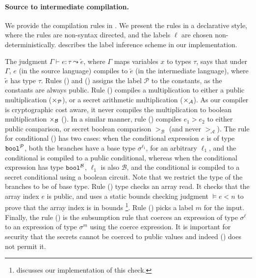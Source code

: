\paragraph{Source to intermediate compilation.} We provide the compilation
rules in . We present the rules in a
declarative style, where the rules are non-syntax
directed, and the labels $\ell$ are chosen
non-deterministically.  describes the label  inference
scheme in our implementation.

The judgment $\Gamma \vdash e : \tau \leadsto \widetilde{e}$, where
$\Gamma$ maps variables $x$ to types $\tau$, says that
under $\Gamma$, $e$ (in the source language) compiles to $\widetilde{e}$
(in the intermediate language), where $\widetilde{e}$ has type $\tau$.
Rules ({}) and ({}) assigns the label
$\mathcal{P}$ to the constants, as the constants are always
public. Rule ({})
compiles a multiplication to either a public multiplication  ($\times_{\mathcal{P}}$), or a
secret arithmetic multiplication ($\times_{\mathcal{A}}$). As
our compiler is cryptographic cost aware, it never compiles the
multiplication to boolean multiplication $\times_{\mathcal{B}}$ (). In a similar manner,
rule ({}) compiles $e_{1} > e_{2}$ to either public comparison,
or secret boolean comparison $>_\mathcal{B}$ (and never
$>_{\mathcal{A}}$).
%
The rule for conditional
({}) has two cases: when the conditional expression $e$ is of
type ${\mathtt{bool}}^{\mathcal{P}}$, both the branches have a base type
$\sigma^{\ell_{1}}$, for an arbitrary $\ell_{1}$, and the conditional is
compiled to a public conditional, whereas when the conditional
expression has type ${\mathtt{bool}}^{\mathcal{B}}$, $\ell_{1}$ is also
$\mathcal{B}$, and the conditional is compiled to a secret conditional
using a boolean circuit. Note that we restrict the type of the branches
to be of base type. 
Rule ({}) type checks an array read. It checks
that the array index $e$ is public, and uses a static bounds checking
judgment $ \models e < n$ to prove that the array index is in
bounds \footnote{ discusses our implementation of this
check.}. Rule ({}) picks a label $m$ for the input. Finally,
the rule ({}) is the subsumption rule that coerces an expression of
type $\sigma^{\ell}$ to an expression of type $\sigma^{m}$ using the
coerce expression. It is important for security that the secrets
cannot be coerced to public values and indeed ({}) does not
permit it.

